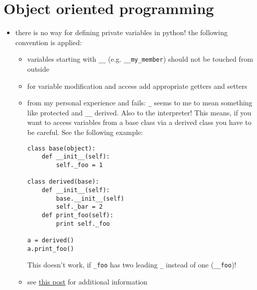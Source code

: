 \documentclass[10pt,a4paper]{scrartcl}
\begin{document}
\section{Object oriented programming}
\begin{itemize}
\item there is no way for defining private variables in python! the following convention is applied:
\begin{itemize}
\item variables starting with \verb+__+ (e.g. \verb+__my_member+) should not be touched from outside
\item for variable modification and access add appropriate getters and setters
\item from my personal experience and fails: \verb+_+ seems to me to mean something like protected and \verb+__+ derived. Also to the interpreter! This means, if you want to access variables from a base class via a derived class you have to be careful. See the following example:
\begin{verbatim}
class base(object):    
    def __init__(self):
        self._foo = 1

class derived(base):    
    def __init__(self):
        base.__init__(self)
        self._bar = 2
    def print_foo(self):
        print self._foo

a = derived()
a.print_foo()
\end{verbatim}
This doesn't work, if \verb+_foo+ has two leading \verb+_+ instead of one (\verb+__foo+)!
\item see \href{http://stackoverflow.com/questions/1641219/does-python-have-private-variables-in-classes}{this post} for additional information
\end{itemize}

\end{itemize}
\end{document}
